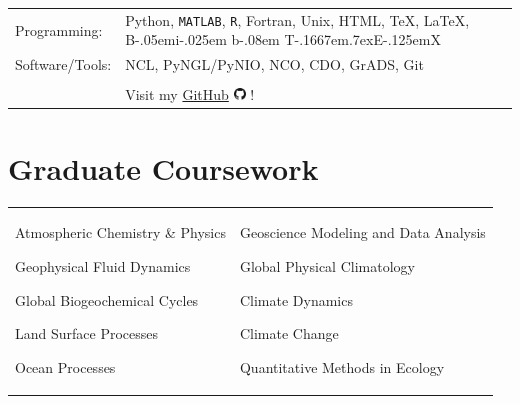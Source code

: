 \documentclass[margin,line,palatino,courier,10pt]{res}
\def\BibTeX{{\rm B\kern-.05em{\sc i\kern-.025em b}\kern-.08em
    T\kern-.1667em\lower.7ex\hbox{E}\kern-.125emX}}
\newenvironment{list1}{
  \begin{list}{\ding{113}}{%
      \setlength{\itemsep}{0in}
      \setlength{\parsep}{0in} \setlength{\parskip}{0in}
      \setlength{\topsep}{0in} \setlength{\partopsep}{0in}
      \setlength{\leftmargin}{0.17in}}}{\end{list}}
\begin{document}
\begin{resume}
\begin{tabular}{@{}p{0.9in}p{6in}}
Programming:& Python, \texttt{MATLAB}, \texttt{R}, Fortran, Unix, HTML, \TeX, \LaTeX, \BibTeX \\
Software/Tools: & NCL, PyNGL/PyNIO, NCO, CDO, GrADS, Git\\\\

& Visit my \href{https://github.com/zmlabe}{GitHub} \includegraphics[height=9pt]{github.png} !\\
\end{tabular}


\noindent\textcolor{Cerulean}{\makebox[\linewidth][r]{\rule{\textwidth}{5pt}}}
\section{\sc \textcolor{Cerulean}{\large{\textbf{Graduate Coursework}}}}
\vspace{-0.3in}
\begin{tabular}{@{}p{2.2in}p{3in}}
\begin{list1}
\item Atmospheric Chemistry \& Physics 
\item Geophysical Fluid Dynamics
\item Global Biogeochemical Cycles
\item Land Surface Processes
\item Ocean Processes
\end{list1}
&
\begin{list1}
\item Geoscience Modeling and Data Analysis
\item Global Physical Climatology
\item Climate Dynamics
\item Climate Change
\item Quantitative Methods in Ecology
\end{list1}
\end{tabular}


\end{resume}
\end{document}
